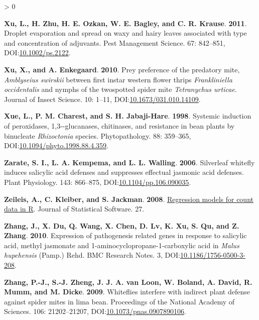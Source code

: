 \documentclass{ufdissertation}[overrideChapters] %
\newlength{\cslhangindent}
\newenvironment{CSLReferences}[2] %
 {%
  \setlength{\parindent}{0pt}
  \ifodd #1 \everypar{\setlength{\hangindent}{\cslhangindent}}\ignorespaces\fi
  \ifnum #2 > 0
  \setlength{\parskip}{#2\baselineskip}
  \fi
 }%
 {}
\begin{document}
{\begin{CSLReferences}{1}{1}
\leavevmode{}%
\textbf{Xu, L., H. Zhu, H. E. Ozkan, W. E. Bagley, and C. R. Krause}. \textbf{2011}. Droplet evaporation and spread on waxy and hairy leaves associated with type and concentration of adjuvants. Pest Management Science. 67: 842--851, DOI:\href{https://doi.org/10.1002/ps.2122}{10.1002/ps.2122}.

\leavevmode{}%
\textbf{Xu, X., and A. Enkegaard}. \textbf{2010}. Prey preference of the predatory mite, {\emph{Amblyseius swirskii}} between first instar western flower thrips {\emph{Frankliniella occidentalis}} and nymphs of the twospotted spider mite {\emph{Tetranychus urticae}}. Journal of Insect Science. 10: 1--11, DOI:\href{https://doi.org/10.1673/031.010.14109}{10.1673/031.010.14109}.

\leavevmode{}%
\textbf{Xue, L., P. M. Charest, and S. H. Jabaji-Hare}. \textbf{1998}. Systemic induction of peroxidases, 1,3-\textbeta-glucanases, chitinases, and resistance in bean plants by binucleate {\emph{Rhizoctonia}} species. Phytopathology{\textregistered}. 88: 359--365, DOI:\href{https://doi.org/10.1094/phyto.1998.88.4.359}{10.1094/phyto.1998.88.4.359}.

\leavevmode{}%
\textbf{Zarate, S. I., L. A. Kempema, and L. L. Walling}. \textbf{2006}. Silverleaf whitefly induces salicylic acid defenses and suppresses effectual jasmonic acid defenses. Plant Physiology. 143: 866--875, DOI:\href{https://doi.org/10.1104/pp.106.090035}{10.1104/pp.106.090035}.

\leavevmode{}%
\textbf{Zeileis, A., C. Kleiber, and S. Jackman}. \textbf{2008}. \href{http://www.jstatsoft.org/v27/i08/}{Regression models for count data in {R}}. Journal of Statistical Software. 27.

\leavevmode{}%
\textbf{Zhang, J., X. Du, Q. Wang, X. Chen, D. Lv, K. Xu, S. Qu, and Z. Zhang}. \textbf{2010}. Expression of pathogenesis related genes in response to salicylic acid, methyl jasmonate and 1-aminocyclopropane-1-carboxylic acid in {\emph{Malus hupehensis}} ({Pamp.}) {Rehd}. {BMC} Research Notes. 3, DOI:\href{https://doi.org/10.1186/1756-0500-3-208}{10.1186/1756-0500-3-208}.

\leavevmode{}%
\textbf{Zhang, P.-J., S.-J. Zheng, J. J. A. van Loon, W. Boland, A. David, R. Mumm, and M. Dicke}. \textbf{2009}. Whiteflies interfere with indirect plant defense against spider mites in lima bean. Proceedings of the National Academy of Sciences. 106: 21202--21207, DOI:\href{https://doi.org/10.1073/pnas.0907890106}{10.1073/pnas.0907890106}.


\end{CSLReferences}}
\end{document}

